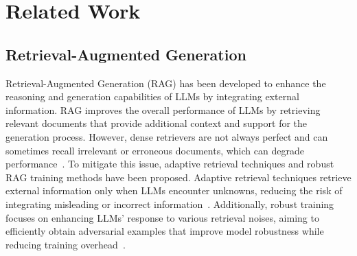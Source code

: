 \section{Related Work}
\subsection{Retrieval-Augmented Generation}
Retrieval-Augmented Generation (RAG) has been developed to enhance the reasoning and generation capabilities of LLMs by integrating external information. RAG improves the overall performance of LLMs by retrieving relevant documents that provide additional context and support for the generation process. However, dense retrievers are not always perfect and can sometimes recall irrelevant or erroneous documents, which can degrade performance~\cite{jiang-etal-2023-active,deng-etal-2023-regavae,DBLP:journals/corr/abs-2402-10612}. To mitigate this issue, adaptive retrieval techniques and robust RAG training methods have been proposed. Adaptive retrieval techniques retrieve external information only when LLMs encounter unknowns, reducing the risk of integrating misleading or incorrect information~\cite{jiang-etal-2023-active,mallen-etal-2023-trust,DBLP:journals/corr/abs-2310-11511}. Additionally, robust training focuses on enhancing LLMs' response to various retrieval noises, aiming to efficiently obtain adversarial examples that improve model robustness while reducing training overhead~\cite{fang-etal-2024-enhancing,zhu-etal-2024-atm,DBLP:journals/corr/abs-2405-15556}.


